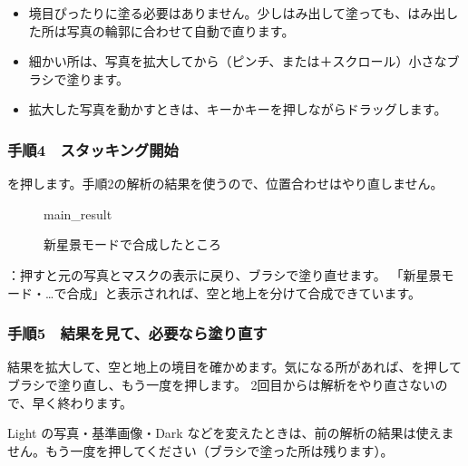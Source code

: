 \begin{hint}[ブラシのこつ]
\begin{itemize}[itemsep=0.2ex,leftmargin=1.2em]
  \item 境目ぴったりに塗る必要はありません。少しはみ出して塗っても、はみ出した所は写真の輪郭に合わせて自動で直ります。
  \item 細かい所は、写真を拡大してから（ピンチ、または＋スクロール）小さなブラシで塗ります。
  \item 拡大した写真を動かすときは、キーかキーを押しながらドラッグします。
\end{itemize}
\end{hint}

\subsubsection*{手順4　スタッキング開始}

を押します。手順2の解析の結果を使うので、位置合わせはやり直しません。

\begin{figure}[H]
\centering
\begin{screenshot}{main_result}
\end{screenshot}
\caption{新星景モードで合成したところ}
\end{figure}

\begin{callouts}
 ：押すと元の写真とマスクの表示に戻り、ブラシで塗り直せます。
 「新星景モード・…で合成」と表示されれば、空と地上を分けて合成できています。
\end{callouts}

\subsubsection*{手順5　結果を見て、必要なら塗り直す}

結果を拡大して、空と地上の境目を確かめます。気になる所があれば、を押してブラシで塗り直し、もう一度を押します。
2回目からは解析をやり直さないので、早く終わります。

\begin{caution}[解析をやり直すとき]
Light の写真・基準画像・Dark などを変えたときは、前の解析の結果は使えません。もう一度を押してください（ブラシで塗った所は残ります）。
\end{caution}

